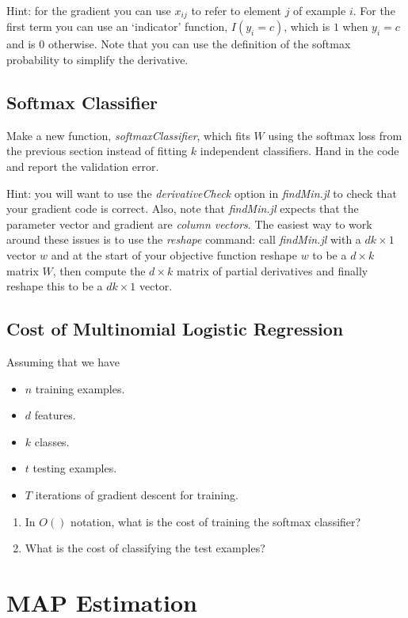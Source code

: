 \documentclass{article}
\def\blu#1{{\color{blu}#1}}
\def\items#1{\begin{itemize}#1\end{itemize}}
\def\enum#1{\begin{enumerate}#1\end{enumerate}}
\begin{document}
Hint: for the gradient you can use $x_{ij}$ to refer to element $j$ of example $i$. For the first term you can use an `indicator' function, $I(y_i = c)$, which is $1$ when $y_i = c$ and is $0$ otherwise. Note that you can use the definition of the softmax probability to simplify the derivative.



\subsection{Softmax Classifier}

Make a new function, \emph{softmaxClassifier}, which fits $W$ using the softmax loss from the previous section  instead of fitting $k$ independent classifiers. \blu{Hand in the code and report the validation error}.

Hint: you will want to use the \emph{derivativeCheck} option in \emph{findMin.jl} to check that your gradient code is correct. Also, note that \emph{findMin.jl} expects that the parameter vector and gradient are \emph{column vectors}. The easiest way to work around these issues is to use the \emph{reshape} command: call \emph{findMin.jl} with a $dk \times 1$ vector $w$ and at the start of your objective function reshape $w$ to be a $d \times k$ matrix $W$, then compute the $d \times k$ matrix of partial derivatives and finally reshape this to be a $dk \times 1$ vector.


\subsection{Cost of Multinomial Logistic Regression}

Assuming that we have
\items{
\item $n$ training examples.
\item $d$ features.
\item $k$ classes.
\item $t$ testing examples.
\item $T$ iterations of gradient descent for training.
}
\blu{\enum{
\item In $O()$ notation, what is the cost of training the softmax classifier?
\item What is the cost of classifying the test examples?
}}



\section{MAP Estimation}
\end{document}
